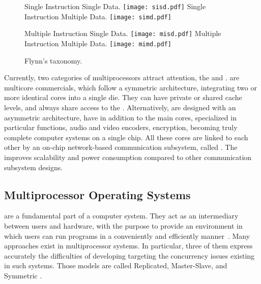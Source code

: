			\begin{figure}[!tb]
				\centering%
				\caption{Flynn's taxonomy.}%
				\label{fig:flynn}%

					{Single Instruction Single Data.}%
					{\texttt{[image: sisd.pdf]}}%
				\hspace{1cm}%
					{Single Instruction Multiple Data.}%
					{\texttt{[image: simd.pdf]}}%

					{Multiple Instruction Single Data.}%
					{\texttt{[image: misd.pdf]}}%
				\hspace{1cm}%
					{Multiple Instruction Multiple Data.}%
					{\texttt{[image: mimd.pdf]}}%

			\end{figure}

			Currently, two categories of multiprocessors attract attention, the \cmp and \mpsoc.
			\cmps are multicore commercials, which follow a symmetric architecture,
			integrating two or more identical cores into a single die.
			They can have private or shared cache levels, and always share access
			to the \ram.
			Alternatively, \mpsocs are designed with an asymmetric architecture,
			have in addition to the main cores, specialized \cpus in particular
			functions, \eg audio and video encoders, encryption, becoming truly
			complete computer systems on a single chip.
			All these cores are linked to each other by an on-chip network-based
			communication subsystem, called \noc.
			The \noc improves scalability and power consumption compared to other
			communication subsystem designs.

		\subsection{Multiprocessor Operating Systems}
		\label{sec.multiprocessor-os}

			\oss are a fundamental part of a computer system.
			They act as an intermediary between users and hardware, with the
			purpose to provide an environment in which users can run programs
			in a conveniently and efficiently manner~\cite{Silberschatz:9ed}.
			Many \os approaches exist in multiprocessor systems.
			In particular, three of them express accurately the difficulties
			of developing \oss targeting the concurrency issues existing in
			such systems.
			Those models are called Replicated, Master-Slave, and Symmetric \os.

